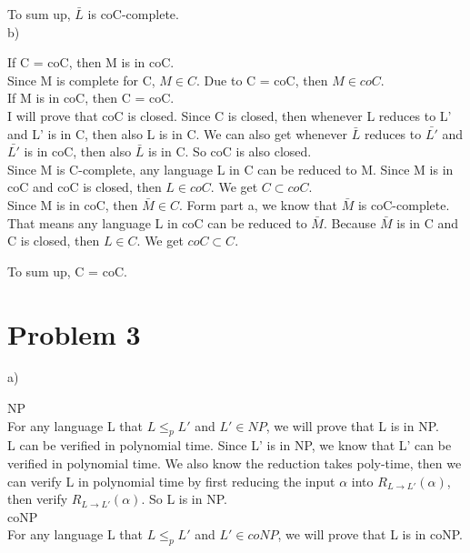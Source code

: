\documentclass[12pt]{article}
\begin{document}
To sum up, $\bar {L}$ is coC-complete. \\

b)

If C = coC, then M is in coC. \\

Since M is complete for C, $M \in C$. Due to C = coC, then $M \in
coC$. \\

If M is in coC, then C = coC. \\

I will prove that coC is closed. Since C is closed, then whenever L
reduces to L' and L' is in C, then also L is in C. We can also get
whenever $\bar {L}$ reduces to $\bar {L'}$ and $\bar {L'}$ is in coC,
then also $\bar {L}$ is in C. So coC is also closed. \\

Since M is C-complete, any language L in C can be reduced to M. Since
M is in coC and coC is closed, then $L \in coC$. We get $C \subset
coC$. \\

Since M is in coC, then $\bar {M} \in C$. Form part a, we know that
$\bar {M}$ is coC-complete. That means any language L in coC can be
reduced to $\bar {M}$. Because $\bar {M}$ is in C and C is closed,
then $L \in C$. We get $coC \subset C$.

To sum up, C = coC.

\section*{Problem 3}

a)

NP \\

For any language L that $L \le_p L'$ and $L' \in NP$, we will prove
that L is in NP. \\

L can be verified in polynomial time. Since L' is in NP, we know that
L' can be verified in polynomial time. We also know the reduction
takes poly-time, then we can verify L in polynomial time by first
reducing the input $\alpha$ into $R_{L \to L'}(\alpha)$, then verify
$R_{L \to L'}(\alpha)$. So L is in NP. \\

coNP \\

For any language L that $L \le_p L'$ and $L' \in coNP$, we will prove
that L is in coNP. \\
\end{document}
